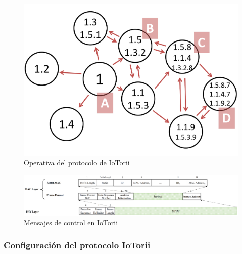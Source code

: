 \\
\begin{figure}[ht!]
    \centering
    \includegraphics[width=\textwidth]{archivos/img/analisis/iotorii-operation.pdf}
    \caption{Operativa del protocolo de IoTorii \cite{rojas2021outperforming}}
    \label{fig:iotorii-operation}
\end{figure}





\begin{figure}
    \centering
    \includegraphics[width=\textwidth]{archivos/img/analisis/Comparation_frame_iotorii.eps}
    \caption{Mensajes de control en IoTorii \cite{rojas2021outperforming}}
    \label{fig:frameformat-setHLMAC}
\end{figure}


\subsubsection{Configuración del protocolo IoTorii}